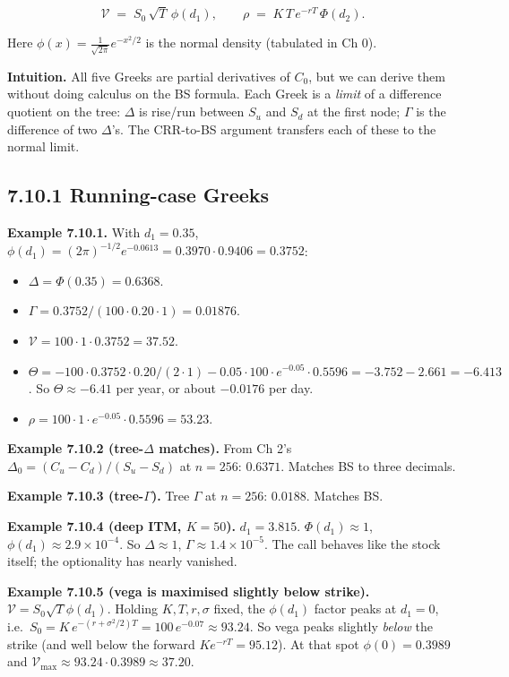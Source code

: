 \documentclass[
  10pt,
  twoside]{book}
\providecommand{\tightlist}{%
  \setlength{\itemsep}{0pt}\setlength{\parskip}{0pt}}
\begin{document}
\[\mathcal V \;=\; S_0\,\sqrt T\,\phi(d_1), \qquad \rho \;=\; K\,T\,e^{-rT}\,\Phi(d_2).\]

Here \(\phi(x) = \tfrac{1}{\sqrt{2\pi}}e^{-x^2/2}\) is the normal
density (tabulated in Ch 0).

\textbf{Intuition.} All five Greeks are partial derivatives of \(C_0\),
but we can derive them without doing calculus on the BS formula. Each
Greek is a \emph{limit} of a difference quotient on the tree: \(\Delta\)
is rise/run between \(S_u\) and \(S_d\) at the first node; \(\Gamma\) is
the difference of two \(\Delta\)'s. The CRR-to-BS argument transfers
each of these to the normal limit.

\subsection{7.10.1 Running-case Greeks}\label{running-case-greeks}

\textbf{Example 7.10.1.} With \(d_1 = 0.35\),
\(\phi(d_1) = (2\pi)^{-1/2} e^{-0.0613} = 0.3970 \cdot 0.9406 = 0.3752\):

\begin{itemize}
\tightlist
\item
  \(\Delta = \Phi(0.35) = 0.6368\).
\item
  \(\Gamma = 0.3752 / (100 \cdot 0.20 \cdot 1) = 0.01876\).
\item
  \(\mathcal V = 100 \cdot 1 \cdot 0.3752 = 37.52\).
\item
  \(\Theta = -100 \cdot 0.3752 \cdot 0.20/(2 \cdot 1) - 0.05 \cdot 100 \cdot e^{-0.05} \cdot 0.5596 = -3.752 - 2.661 = -6.413\).
  So \(\Theta \approx -6.41\) per year, or about \(-0.0176\) per day.
\item
  \(\rho = 100 \cdot 1 \cdot e^{-0.05} \cdot 0.5596 = 53.23\).
\end{itemize}

\textbf{Example 7.10.2 (tree-\(\Delta\) matches).} From Ch 2's
\(\Delta_0 = (C_u - C_d)/(S_u - S_d)\) at \(n = 256\): \(0.6371\).
Matches BS to three decimals.

\textbf{Example 7.10.3 (tree-\(\Gamma\)).} Tree \(\Gamma\) at
\(n = 256\): \(0.0188\). Matches BS.

\textbf{Example 7.10.4 (deep ITM, \(K = 50\)).} \(d_1 = 3.815\).
\(\Phi(d_1) \approx 1\), \(\phi(d_1) \approx 2.9 \times 10^{-4}\). So
\(\Delta \approx 1\), \(\Gamma \approx 1.4 \times 10^{-5}\). The call
behaves like the stock itself; the optionality has nearly vanished.

\textbf{Example 7.10.5 (vega is maximised slightly below strike).}
\(\mathcal V = S_0\sqrt T \phi(d_1)\). Holding \(K, T, r, \sigma\)
fixed, the \(\phi(d_1)\) factor peaks at \(d_1=0\),
i.e.~\(S_0 = K\,e^{-(r+\sigma^2/2)T} = 100\,e^{-0.07} \approx 93.24\).
So vega peaks slightly \emph{below} the strike (and well below the
forward \(Ke^{-rT}=95.12\)). At that spot \(\phi(0) = 0.3989\) and
\(\mathcal V_{\max} \approx 93.24\cdot 0.3989 \approx 37.20\).
\end{document}
